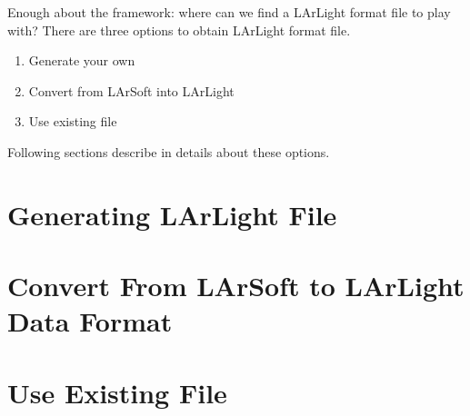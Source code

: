 Enough about the framework: where can we find a LArLight format \ROOT file to play with?
There are three options to obtain LArLight format \ROOT file.
\begin{enumerate}
\item Generate your own
\item Convert from LArSoft into LArLight
\item Use existing file
\end{enumerate}
Following sections describe in details about these options.

\section{Generating LArLight File}
\label{sec:datafile:generate}


\section{Convert From LArSoft to LArLight Data Format}
\label{sec:datafile:convert}


\section{Use Existing File}
\label{sec:datafile::existing}


